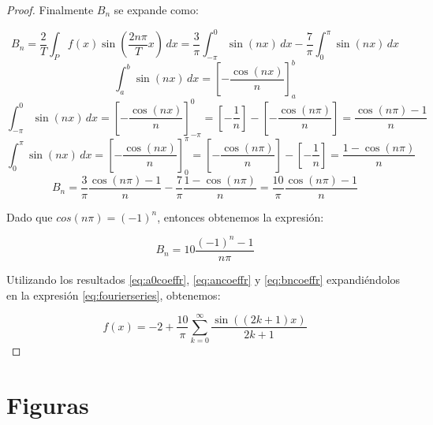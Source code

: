 \documentclass{article}[12pt,a4paper]
\begin{document}
\begin{proof}
  Finalmente \(B_n\) se expande como:

  \begin{equation*}
    B_n=\frac{2}{T}\int_{P}f(x)\sin\left(\frac{2n\pi}{T}x\right)\,dx=\frac{3}{\pi}\int_{-\pi}^{0}\sin\left(nx\right)\,dx-\frac{7}{\pi}\int_{0}^{\pi}\sin\left(nx\right)\,dx
  \end{equation*}
  \begin{equation*}
    \int_{a}^{b}\sin\left(nx\right)\,dx=\left[-\frac{\cos\left(nx\right)}{n}\right]_{a}^{b}
  \end{equation*}
  \begin{equation*}
    \int_{-\pi}^{0}\sin\left(nx\right)\,dx=\left[-\frac{\cos\left(nx\right)}{n}\right]_{-\pi}^{0}=\left[-\frac{1}{n}\right]-\left[-\frac{\cos\left(n\pi\right)}{n}\right]=\frac{\cos\left(n\pi\right)-1}{n}
  \end{equation*}
  \begin{equation*}
    \int_{0}^{\pi}\sin\left(nx\right)\,dx=\left[-\frac{\cos\left(nx\right)}{n}\right]_{0}^{\pi}=\left[-\frac{\cos\left(n\pi\right)}{n}\right]-\left[-\frac{1}{n}\right]=\frac{1-\cos\left(n\pi\right)}{n}
  \end{equation*}
  \begin{equation*}
    B_n=\frac{3}{\pi}\frac{\cos\left(n\pi\right)-1}{n}-\frac{7}{\pi}\frac{1-\cos\left(n\pi\right)}{n}=\frac{10}{\pi}\frac{\cos\left(n\pi\right)-1}{n}
  \end{equation*}

  Dado que \(cos\left(n\pi\right)=(-1)^n\), entonces obtenemos la expresión:

  \begin{equation}
    B_n=10\frac{(-1)^n-1}{n\pi}
    \label{eq:bncoeffr}
  \end{equation}

  Utilizando los resultados \ref{eq:a0coeffr}, \ref{eq:ancoeffr} y \ref{eq:bncoeffr} expandiéndolos en la expresión \ref{eq:fourierseries}, obtenemos:

  \begin{equation}
    f(x)=-2+\frac{10}{\pi}\sum_{k=0}^{\infty}\frac{\sin\left(\left(2k+1\right)x\right)}{2k+1}
  \end{equation}

\end{proof}

\section{Figuras}
\end{document}
